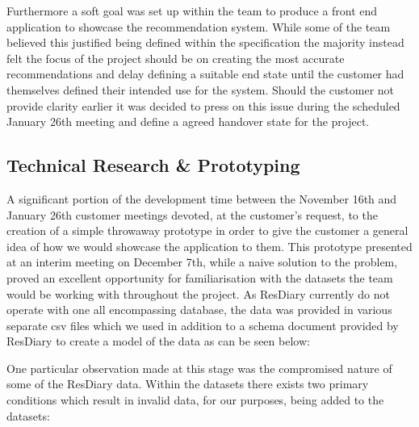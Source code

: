 \documentclass{l3proj}
\begin{document}
Furthermore a soft goal was set up within the team to produce a front end application to showcase the recommendation system. While some of the team believed this justified being defined within the specification the majority instead felt the focus of the project should be on creating the most accurate recommendations and delay defining a suitable end state until the customer had themselves defined their intended use for the system. Should the customer not provide clarity earlier it was decided to press on this issue during the scheduled January 26th meeting and define a agreed handover state for the project.


\subsection{Technical Research \& Prototyping}
\label{sec:techresearchproto}

A significant portion of the development time between the November 16th and January 26th customer meetings devoted, at the customer’s request, to the creation of a simple throwaway prototype in order to give the customer a general idea of how we would showcase the application to them. This prototype presented at an interim meeting on December 7th, while a naive solution to the problem, proved an excellent opportunity for familiarisation with the datasets the team would be working with throughout the project. As ResDiary currently do not operate with one all encompassing database, the data was provided in various separate csv files which we used in addition to a schema document provided by ResDiary to create a model of the data as can be seen below:

One particular observation made at this stage was the compromised nature of some of the ResDiary data. Within the datasets there exists two primary conditions which result in invalid data, for our purposes, being added to the datasets:
\end{document}
